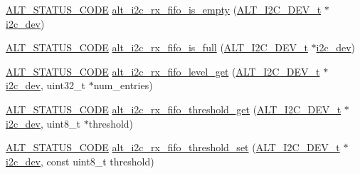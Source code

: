 \begin{DoxyCompactItemize}
\item 
\mbox{\hyperlink{hwlib_8h_abdb0d369f069723ca55d6c94bcaaaa12}{A\+L\+T\+\_\+\+S\+T\+A\+T\+U\+S\+\_\+\+C\+O\+DE}} \mbox{\hyperlink{group__ALT__I2C__RX__FIFO_gacfc0421dad98b6fbd6abfba07c059d3d}{alt\+\_\+i2c\+\_\+rx\+\_\+fifo\+\_\+is\+\_\+empty}} (\mbox{\hyperlink{structALT__I2C__DEV__s}{A\+L\+T\+\_\+\+I2\+C\+\_\+\+D\+E\+V\+\_\+t}} $\ast$\mbox{\hyperlink{structi2c__dev}{i2c\+\_\+dev}})
\item 
\mbox{\hyperlink{hwlib_8h_abdb0d369f069723ca55d6c94bcaaaa12}{A\+L\+T\+\_\+\+S\+T\+A\+T\+U\+S\+\_\+\+C\+O\+DE}} \mbox{\hyperlink{group__ALT__I2C__RX__FIFO_gac1dd68ec990d8bb5ce40157855c4dd7b}{alt\+\_\+i2c\+\_\+rx\+\_\+fifo\+\_\+is\+\_\+full}} (\mbox{\hyperlink{structALT__I2C__DEV__s}{A\+L\+T\+\_\+\+I2\+C\+\_\+\+D\+E\+V\+\_\+t}} $\ast$\mbox{\hyperlink{structi2c__dev}{i2c\+\_\+dev}})
\item 
\mbox{\hyperlink{hwlib_8h_abdb0d369f069723ca55d6c94bcaaaa12}{A\+L\+T\+\_\+\+S\+T\+A\+T\+U\+S\+\_\+\+C\+O\+DE}} \mbox{\hyperlink{group__ALT__I2C__RX__FIFO_ga2e0e7b4f85140e81aeaa10007fd63059}{alt\+\_\+i2c\+\_\+rx\+\_\+fifo\+\_\+level\+\_\+get}} (\mbox{\hyperlink{structALT__I2C__DEV__s}{A\+L\+T\+\_\+\+I2\+C\+\_\+\+D\+E\+V\+\_\+t}} $\ast$\mbox{\hyperlink{structi2c__dev}{i2c\+\_\+dev}}, uint32\+\_\+t $\ast$num\+\_\+entries)
\item 
\mbox{\hyperlink{hwlib_8h_abdb0d369f069723ca55d6c94bcaaaa12}{A\+L\+T\+\_\+\+S\+T\+A\+T\+U\+S\+\_\+\+C\+O\+DE}} \mbox{\hyperlink{group__ALT__I2C__RX__FIFO_ga4772432d9bc0c0fcf944d2174bb4452d}{alt\+\_\+i2c\+\_\+rx\+\_\+fifo\+\_\+threshold\+\_\+get}} (\mbox{\hyperlink{structALT__I2C__DEV__s}{A\+L\+T\+\_\+\+I2\+C\+\_\+\+D\+E\+V\+\_\+t}} $\ast$\mbox{\hyperlink{structi2c__dev}{i2c\+\_\+dev}}, uint8\+\_\+t $\ast$threshold)
\item 
\mbox{\hyperlink{hwlib_8h_abdb0d369f069723ca55d6c94bcaaaa12}{A\+L\+T\+\_\+\+S\+T\+A\+T\+U\+S\+\_\+\+C\+O\+DE}} \mbox{\hyperlink{group__ALT__I2C__RX__FIFO_ga1c108da9dc02648f215035d878b92b88}{alt\+\_\+i2c\+\_\+rx\+\_\+fifo\+\_\+threshold\+\_\+set}} (\mbox{\hyperlink{structALT__I2C__DEV__s}{A\+L\+T\+\_\+\+I2\+C\+\_\+\+D\+E\+V\+\_\+t}} $\ast$\mbox{\hyperlink{structi2c__dev}{i2c\+\_\+dev}}, const uint8\+\_\+t threshold)
\end{DoxyCompactItemize}


